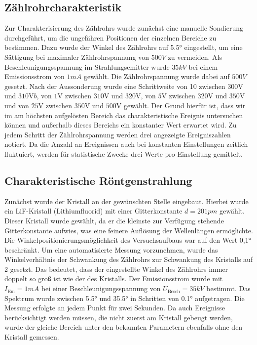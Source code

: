 \subsection{ Zählrohrcharakteristik}
Zur Charakterisierung des Zählrohrs wurde zunächst eine manuelle Sondierung durchgeführt, um die ungefähren Positionen der einzelnen Bereiche zu bestimmen. Dazu wurde der Winkel des Zählrohrs auf \ang{5.5} eingestellt, um eine Sättigung bei maximaler Zählrohrspannung von $500 \unit{V}$ zu vermeiden. Als Beschleunigungsspannung im Strahlungsemitter wurde $35 \unit{kV}$ bei einem Emissionsstrom von $1 \unit{mA}$ gewählt. Die Zählrohrspannung wurde dabei auf $500 \unit{V} $ gesetzt. Nach der Aussonderung wurde eine Schrittweite von 10 zwischen $300 \mathrm{V}$ und $310 \mathrm{V}b$, von $1  \mathrm{V}$ zwischen $310  \mathrm{V}$ und $320 \mathrm{V}$, von $5 \mathrm{V}$ zwischen $320 \mathrm{V}$ und $350 \mathrm{V}$ und von $25 \mathrm{V}$ zwischen $350 \mathrm{V}$ und $500 \mathrm{V}$ gewählt. Der Grund hierfür ist, dass wir im am höchsten aufgelösten Bereich das charakteristische Ereignis untersuchen können und außerhalb dieses Bereichs ein konstanter Wert erwartet wird. Zu jedem Schritt der Zählrohrspannung werden drei angezeigte  Ereigniszahlen notiert. Da die Anzahl an Ereignissen auch bei konstanten Einstellungen zeitlich fluktuiert, werden für statistische Zwecke drei Werte pro Einstellung gemittelt. 

\subsection{Charakteristische Röntgenstrahlung}
Zunächst wurde der Kristall an der gewünschten Stelle eingebaut. Hierbei wurde ein LiF-Kristall (Lithiumfluorid) mit einer Gitterkonstante $d=201 \unit{pm}$ gewählt. Dieser Kristall wurde gewählt, da er die kleinste zur Verfügung stehende  Gitterkonstante aufwies, was eine feinere Auflösung der Wellenlängen ermöglichte. Die Winkelpositionierungsmöglichkeit des Versuchsaufbaus war auf den Wert \ang{0,1} beschränkt. Um eine automatisierte Messung vorzunehmen, wurde das Winkelverhältnis der Schwankung des Zählrohrs zur Schwankung des Kristalls auf 2 gesetzt. Das bedeutet, dass der eingestellte Winkel des Zählrohrs immer doppelt so groß ist wie der des Kristalls. Der Emissionsstrom wurde mit $I_\mathrm{Em}=1 \unit{mA}$ bei einer Beschleunigungsspannung von $U_\mathrm{Besch}=35 \unit{kV}$ bestimmt. Das Spektrum wurde zwischen \ang{5.5} und \ang {35.5} in Schritten von \ang{0.1} aufgetragen. Die Messung erfolgte an jedem Punkt für zwei Sekunden. Da auch Ereignisse berücksichtigt werden müssen, die nicht zuerst am Kristall gebeugt werden, wurde der gleiche Bereich unter den bekannten Parametern ebenfalls ohne den Kristall gemessen. 

